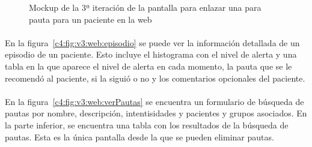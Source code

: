 \begin{figure}[H]
    \centering
    \caption[Mockup de la 3ª iteración de la pantalla para enlazar una para pauta para un paciente en la web]{Mockup de la 3ª iteración de la pantalla para enlazar una para pauta para un paciente en la web}
    \label{c4:fig:v3:web:enlazarPautaPaciente}
\end{figure}




\paragraph{}
En la figura~\ref{c4:fig:v3:web:episodio} se puede ver la información detallada de un episodio de un paciente. Esto incluye el histograma con el nivel de alerta y una tabla en la que aparece el nivel de alerta en cada momento, la pauta que se le recomendó al paciente, si la siguió o no y los comentarios opcionales del paciente.

\paragraph{}
En la figura~\ref{c4:fig:v3:web:verPautas} se encuentra un formulario de búsqueda de pautas por nombre, descripción, intentisidades y pacientes y grupos asociados. En la parte inferior, se encuentra una tabla con los resultados de la búsqueda de pautas. Esta es la única pantalla desde la que se pueden eliminar pautas.

